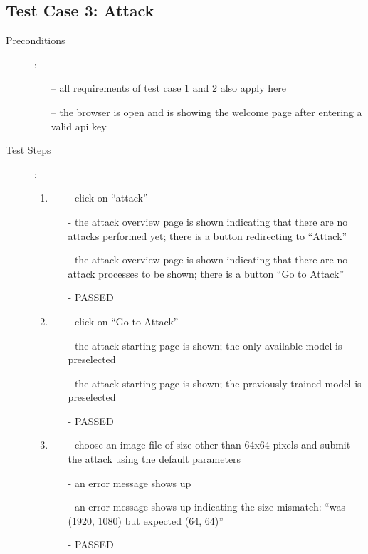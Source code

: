 \subsection{Test Case 3: Attack}
\begin{description}
	\item[Preconditions]: 
	\begin{itemize}
		\item [--] all requirements of test case 1 and 2 also apply here
		\item [--] the browser is open and is showing the welcome page after entering a valid api key
	\end{itemize}
	\item[Test Steps]: 
	\begin{enumerate}
		\item  
		\begin{itemize}
			\item [-] click on \enquote{attack}
			\item [-] the attack overview page is shown indicating that there are no attacks performed yet; there is a button redirecting to \enquote{Attack}
			\item [-] the attack overview page is shown indicating that there are no attack processes to be shown; there is a button \enquote{Go to Attack}
			\item [-] PASSED
		\end{itemize}
		\item  
		\begin{itemize}
			\item [-] click on \enquote{Go to Attack}
			\item [-] the attack starting page is shown; the only available model is preselected
			\item [-] the attack starting page is shown; the previously trained model is preselected
			\item [-] PASSED
		\end{itemize}
		\item  
		\begin{itemize}
			\item [-] choose an image file of size other than 64x64 pixels and submit the attack using the default parameters
			\item [-] an error message shows up
			\item [-] an error message shows up indicating the size mismatch: \enquote{was (1920, 1080) but expected (64, 64)}
			\item [-] PASSED

\end{itemize}
\end{enumerate}
\end{description}
